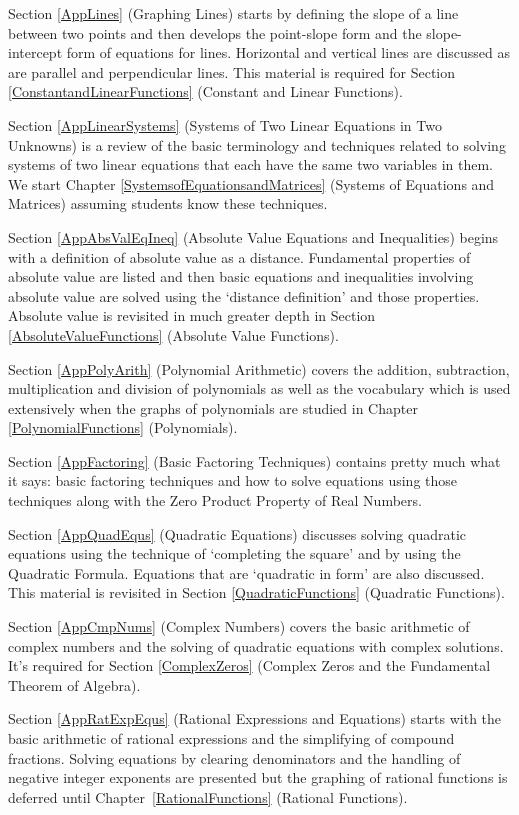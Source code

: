 Section \ref{AppLines} (Graphing Lines) starts by defining the slope of a line between two points and then develops the point-slope form and the slope-intercept form of equations for lines.  Horizontal and vertical lines are discussed as are parallel and perpendicular lines.  This material is required for Section \ref{ConstantandLinearFunctions} (Constant and Linear Functions).

Section \ref{AppLinearSystems} (Systems of Two Linear Equations in Two Unknowns) is a review of the basic terminology and techniques related to solving systems of two linear equations that each have the same two variables in them.  We start Chapter \ref{SystemsofEquationsandMatrices} (Systems of Equations and Matrices) assuming students know these techniques.

Section \ref{AppAbsValEqIneq} (Absolute Value Equations and Inequalities) begins with a definition of absolute value as a distance.  Fundamental properties of absolute value are listed and then basic equations and inequalities involving absolute value are solved using the `distance definition' and those properties.  Absolute value is revisited in much greater depth in Section \ref{AbsoluteValueFunctions} (Absolute Value Functions).

Section \ref{AppPolyArith} (Polynomial Arithmetic) covers the addition, subtraction, multiplication and division of polynomials as well as the vocabulary which is used extensively when the graphs of polynomials are studied in Chapter \ref{PolynomialFunctions} (Polynomials).

Section \ref{AppFactoring} (Basic Factoring Techniques) contains pretty much what it says: basic factoring techniques and how to solve equations using those techniques along with the Zero Product Property of Real Numbers.

Section \ref{AppQuadEqus} (Quadratic Equations) discusses solving quadratic equations using the technique of `completing the square' and by using the Quadratic Formula.  Equations that are `quadratic in form' are also discussed.  This material is revisited in Section \ref{QuadraticFunctions} (Quadratic Functions).

Section \ref{AppCmpNums} (Complex Numbers) covers the basic arithmetic of complex numbers and the solving of quadratic equations with complex solutions.  It's required for Section \ref{ComplexZeros} (Complex Zeros and the Fundamental Theorem of Algebra).

Section \ref{AppRatExpEqus} (Rational Expressions and Equations) starts with the basic arithmetic of rational expressions and the simplifying of compound fractions.  Solving equations by clearing denominators and the handling of negative integer exponents are presented but the graphing of rational functions is deferred until Chapter~\ref{RationalFunctions}  (Rational Functions).

